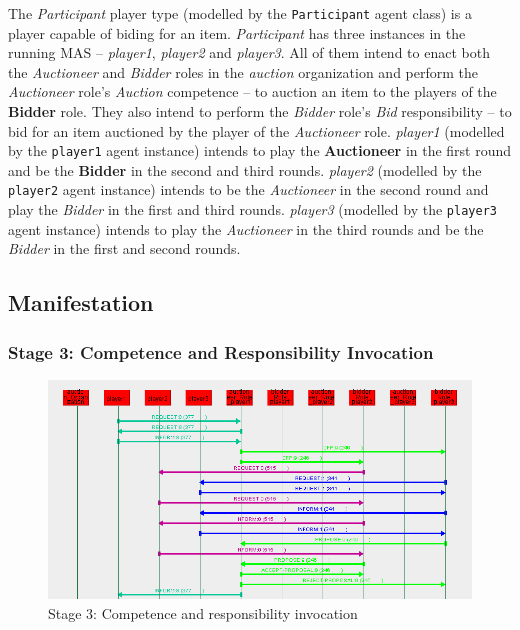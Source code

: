 The \textit{Participant} player type (modelled by the \texttt{Participant} agent class) is a player capable of biding for an item.
\textit{Participant} has three instances in the running MAS -- \textit{player1}, \textit{player2} and \textit{player3}.
All of them intend to enact both the \textit{Auctioneer} and \textit{Bidder} roles in the \textit{auction} organization and perform the \textit{Auctioneer} role's \textit{Auction} competence -- to auction an item to the players of the \textbf{Bidder} role.
They also intend to perform the \textit{Bidder} role's \textit{Bid} responsibility -- to bid for an item auctioned by the player of the \textit{Auctioneer} role.
\textit{player1} (modelled by the \texttt{player1} agent instance) intends to play the \textbf{Auctioneer} in the first round and be the \textbf{Bidder} in the second and third rounds.
\textit{player2} (modelled by the \texttt{player2} agent instance) intends to be the \textit{Auctioneer} in the second round and play the \textit{Bidder} in the first and third rounds.
\textit{player3} (modelled by the \texttt{player3} agent instance) intends to play the \textit{Auctioneer} in the third rounds and be the \textit{Bidder} in the first and second rounds.

\subsection*{Manifestation} 

\subsubsection*{Stage 3: Competence and Responsibility Invocation}

\begin{figure}[H]
	\centering
	\includegraphics[width=\textwidth]{images/examples/example3-stageA3.png}
	\caption{Stage 3: Competence and responsibility invocation}
	\label{figure:example3-stageA3}
\end{figure}


